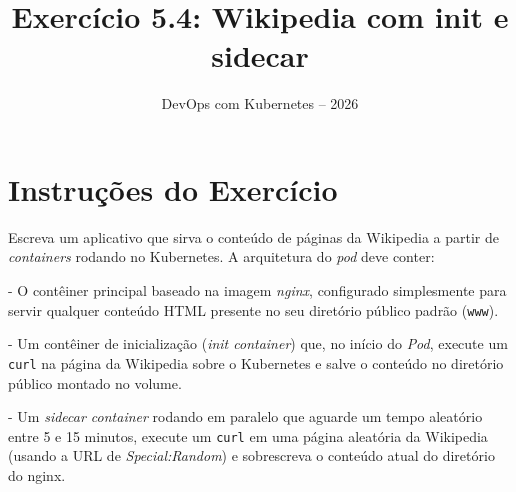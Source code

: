 \documentclass[11pt,a4paper]{article}
\title{\color{secondary}\Huge\textbf{Exercício 5.4: Wikipedia com init e sidecar}}
\author{\color{primary}DevOps com Kubernetes -- 2026}
\date{}
\begin{document}
\maketitle

\section*{\color{primary}Instruções do Exercício}
\begin{tcolorbox}[colback=blue!5!white,colframe=blue!75!black,title=Exercício 5.4: Wikipedia com init e sidecar]
Escreva um aplicativo que sirva o conteúdo de páginas da Wikipedia a partir de \textit{containers} rodando no Kubernetes. A arquitetura do \textit{pod} deve conter:

- O contêiner principal baseado na imagem \textit{nginx}, configurado simplesmente para servir qualquer conteúdo HTML presente no seu diretório público padrão (\texttt{www}).

- Um contêiner de inicialização (\textit{init container}) que, no início do \textit{Pod}, execute um \texttt{curl} na página da Wikipedia sobre o Kubernetes e salve o conteúdo no diretório público montado no volume.

- Um \textit{sidecar container} rodando em paralelo que aguarde um tempo aleatório entre 5 e 15 minutos, execute um \texttt{curl} em uma página aleatória da Wikipedia (usando a URL de \textit{Special:Random}) e sobrescreva o conteúdo atual do diretório do nginx.
\end{tcolorbox}
\end{document}

